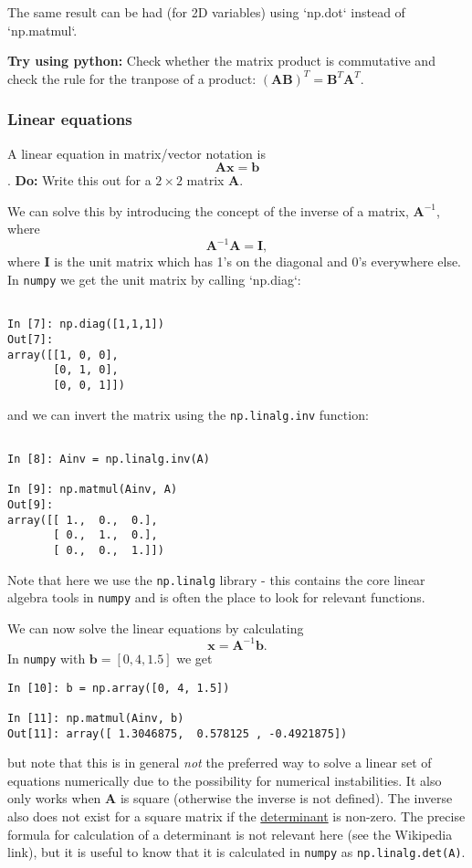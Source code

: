 \documentclass[a4paper,10pt]{article}
\newcommand{\link}[2]{{\color{blue}\href{#1}{#2}}}
\begin{document}
The same result can be had (for 2D variables) using `np.dot` instead of `np.matmul`.

\textbf{Try using python:} Check whether the matrix product is commutative and check the rule for the tranpose of a product:
$(\mathbf{A}\mathbf{B})^T = \mathbf{B}^T\mathbf{A}^T$.


\subsubsection{ Linear equations}

A linear equation in matrix/vector notation is
$$\mathbf{A}\mathbf{x} = \mathbf{b}$$.
\textbf{Do:} Write this out for a $2\times 2$ matrix $\mathbf{A}$.

We can solve this by introducing the concept of the inverse of a matrix, $\mathbf{A}^{-1}$, where
$$\mathbf{A}^{-1} \mathbf{A} = \mathbf{I},$$ where $ \mathbf{I}$ is the unit matrix which has 1's on the diagonal and 0's everywhere else. In \texttt{numpy} we get the unit matrix by calling `np.diag`:
\begin{lstlisting}

In [7]: np.diag([1,1,1])
Out[7]: 
array([[1, 0, 0],
       [0, 1, 0],
       [0, 0, 1]])
\end{lstlisting}
and we can invert the matrix using the \texttt{np.linalg.inv} function:
\begin{lstlisting}

In [8]: Ainv = np.linalg.inv(A)

In [9]: np.matmul(Ainv, A)
Out[9]: 
array([[ 1.,  0.,  0.],
       [ 0.,  1.,  0.],
       [ 0.,  0.,  1.]])
\end{lstlisting}
Note that here we use the \texttt{np.linalg} library - this contains the core linear algebra tools in \texttt{numpy} and is often the place to look for relevant functions.

We can now solve the linear equations by calculating
$$\mathbf{x} = \mathbf{A}^{-1} \mathbf{b}.$$ In \texttt{numpy} with $\mathbf{b}=[0,  4, 1.5]$ we get

\begin{lstlisting}
In [10]: b = np.array([0, 4, 1.5])

In [11]: np.matmul(Ainv, b)
Out[11]: array([ 1.3046875,  0.578125 , -0.4921875])
\end{lstlisting}

but note that this is in general \textit{not} the preferred way to solve a linear set of equations numerically due to the possibility for numerical instabilities. It also only works when $\mathbf{A}$ is square (otherwise the inverse is not defined). The inverse also does not exist for a square matrix if the \link{https://en.wikipedia.org/wiki/Determinant}{determinant} is non-zero. The precise formula for calculation of a determinant is not relevant here (see the Wikipedia link), but it is useful to know that it is calculated in \texttt{numpy} as \texttt{np.linalg.det(A)}. 
\end{document}
